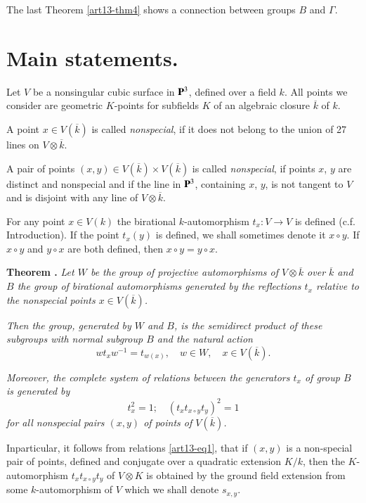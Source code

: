 The last Theorem \ref{art13-thm4} shows a connection between groups $B$ and $\Gamma$.

\section*{Main statements.}

Let $V$ be a nonsingular cubic surface in $\mathbf{P}^{3}$, defined over a field $k$. All points we consider are geometric $K$-points for subfields $K$ of an algebraic closure $\overline{k}$ of $k$.

A point $x\in V(\overline{k})$ is called {\em nonspecial}, if it does not belong to the union of 27 lines on $V\otimes \overline{k}$.

A pair of points $(x,y)\in V(\overline{k})\times V(\overline{k})$ is called {\em nonspecial}, if points $x$, $y$ are distinct and nonspecial and if the line in $\mathbf{P}^{3}$, containing $x$, $y$, is not tangent to $V$ and is disjoint with any line of $V\otimes\overline{k}$.

For any point $x\in V(k)$ the birational $k$-automorphism $t_{x}:V\to V$ is defined (c.f. Introduction). If the point $t_{x}(y)$ is defined, we shall sometimes denote it $x\circ y$. If $x\circ y$ and $y\circ x$ are both defined, then $x\circ y=y\circ x$.

\medskip
\noindent
{\bf Theorem .\label{art13-thm1}}
{\em Let $W$ be the group of projective automorphisms of $V\otimes \overline{k}$ over $\overline{k}$ and $B$ the group of birational automorphisms generated by the reflections $t_{x}$ relative to the nonspecial points $x\in V(\overline{k})$.}

{\em Then the group, generated by $W$ and $B$, is the semidirect product of these subgroups with normal subgroup $B$ and the natural action}
$$
wt_{x}w^{-1}=t_{w(x)},\quad w\in W, \quad x\in V(\overline{k}).
$$

{\em Moreover, the complete system of relations between the generators $t_{x}$ of group $B$ is generated by}
\begin{equation*}
t^{2}_{x}=1;\quad (t_{x}t_{x\circ y}t_{y})^{2}=1\tag{1}\label{art13-eq1}
\end{equation*}
{\em for all nonspecial pairs $(x,y)$ of points of $V(\overline{k})$.}
\smallskip

In\pageoriginale particular, it follows from relations \eqref{art13-eq1}, that if $(x,y)$ is a non-special pair of points, defined and conjugate over a quadratic extension $K/k$, then the $K$-automorphism $t_{x}t_{x\circ y}t_{y}$ of $V\otimes K$ is obtained by the ground field extension from some $k$-automorphism of $V$ which we shall denote $s_{x,y}$.


